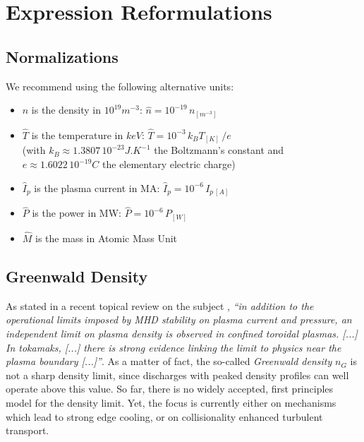 \section{Expression Reformulations}
\subsection{Normalizations}
We recommend using the following alternative units: 
\begin{itemize}
    \item $\hat n$ is the density in $10^{19} \si{m^{-3}}$: 
    $\hat n = 10^{-19}\,n_{\si{[m^{-3}]}}$
    \item $\hat T$ is the temperature in $keV$: $\hat T = 10^{-3}\, k_B T_{[K]}\,/e$ \\(with $k_B \approx 1.3807\, 10^{-23} \si{J.K^{-1}}$ the Boltzmann's constant and $e\approx 1.6022\, 10^{-19}C$ the elementary electric charge)
    \item $\hat I_p$ is the plasma current in MA: $\hat I_p = 10^{-6}\,I_{p\,[A]}$
    \item $\hat P$ is the power in MW: $\hat P = 10^{-6}\, P_{[W]}$
    \item $\hat M$ is the mass in Atomic Mass Unit
\end{itemize}



\subsection{Greenwald Density}
As stated in a recent topical review on the subject \cite{Greenwald2002}, \emph{``in addition to the operational limits imposed by MHD stability on plasma current and pressure, an independent limit on plasma density is observed in confined toroidal plasmas. [...] In tokamaks, [...] there is strong evidence linking the limit to physics near the plasma boundary [...]''}. As a matter of fact, the so-called \textit{Greenwald density} $n_G$ is not a sharp density limit, since discharges with peaked density profiles can well operate above this value. So far, there is no widely accepted, first principles model for the density limit. Yet, the focus is currently either on mechanisms which lead to strong edge cooling, or on collisionality enhanced turbulent transport.

